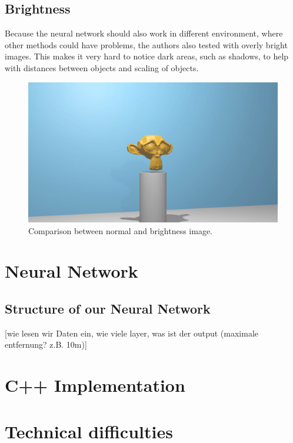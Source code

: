 \subsection{Brightness}

Because the neural network should also work in different environment, where other methods could have problems, the authors also tested with overly bright images. This makes it very hard to notice dark areas, such as shadows, to help with distances between objects and scaling of objects.

\begin{figure}[h!]
	\centering
	\includegraphics[width=4.5in]{img/implementation_opencv_brightness.jpg}
	\caption{Comparison between normal and brightness image.}
	\label{pic:implementation_opencv_brightness}
\end{figure}

\section{Neural Network}
\subsection{Structure of our Neural Network}

[wie lesen wir Daten ein, wie viele layer, was ist der output (maximale entfernung? z.B. 10m)]

\section{C++ Implementation}

\section{Technical difficulties}

\filbreak
